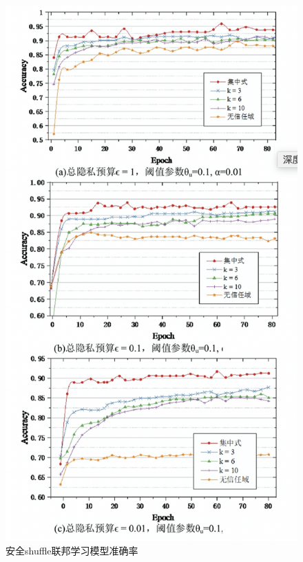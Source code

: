 \begin{figure}[!hbt]
\centering
  	\includegraphics[scale=0.6]{fig2/C5/安全shuffle}%
	\caption{安全shuffle联邦学习模型准确率}
  	\label{fig:安全shuffle联邦学习模型准确率} 
\end{figure}

